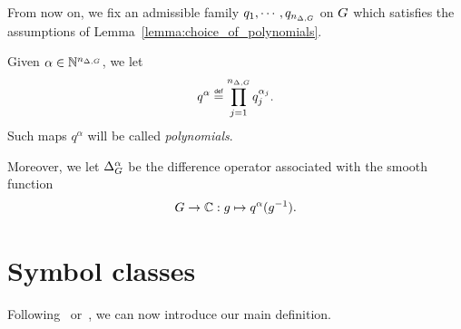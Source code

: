 \begin{remark}
    From now on, we fix an admissible family $q_1, \cdots, q_{n_{\Delta, G}}$ on $G$
    which satisfies the assumptions of Lemma~\ref{lemma:choice_of_polynomials}.

    Given $\alpha \in \mathbb{N}^{n_{\Delta, G}}$, we let
    \begin{align*}
        q^\alpha \defeq \prod_{j = 1}^{\dimDifferenceOperators} q_j^{\alpha_j}.
    \end{align*}
    Such maps $q^\alpha$ will be called \emph{polynomials}.

    Moreover, we let ${\Delta_{G}^{\alpha}}$ be the difference operator associated with the smooth function
    \begin{align*}
        G \to \mathbb{C} : g \mapsto q^\alpha(g^{-1}).
    \end{align*}
\end{remark}

\section{Symbol classes}

Following~\cite{RuzhanskyTurunen10} or~\cite{FischerRuzhansky16},
we can now introduce our main definition.

